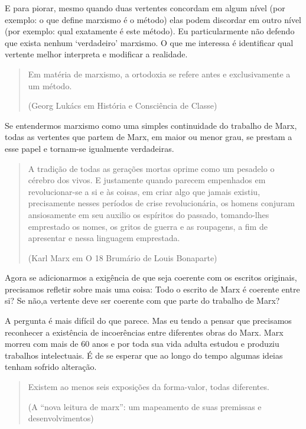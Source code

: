 E para piorar, mesmo quando duas vertentes concordam em algum nível (por exemplo: o que define marxismo é o método) elas podem discordar em outro nível (por exemplo: qual exatamente é este método). Eu particularmente não defendo que exista nenhum ‘verdadeiro’ marxismo. O que me interessa é identificar qual vertente melhor interpreta e modificar a realidade.

\begin{quote}
Em matéria de marxismo, a ortodoxia se refere antes e exclusivamente a um método.

(Georg Lukács em História e Consciência de Classe)
\end{quote}

Se entendermos marxismo como uma simples continuidade do trabalho de Marx, todas as vertentes que partem de Marx, em maior ou menor grau, se prestam a esse papel e tornam-se igualmente verdadeiras.

\begin{quote}
A tradição de todas as gerações mortas oprime como um pesadelo o cérebro dos vivos. E justamente quando parecem empenhados em revolucionar-se a si e às coisas, em criar algo que jamais existiu, precisamente nesses períodos de crise revolucionária, os homens conjuram ansiosamente em seu auxilio os espíritos do passado, tomando-lhes emprestado os nomes, os gritos de guerra e as roupagens, a fim de apresentar e nessa linguagem emprestada.

(Karl Marx em O 18 Brumário de Louis Bonaparte)
\end{quote}

Agora se adicionarmos a exigência de que seja coerente com os escritos originais, precisamos refletir sobre mais uma coisa: Todo o escrito de Marx é coerente entre si? Se não,a vertente deve ser coerente com que parte do trabalho de Marx?

A pergunta é mais difícil do que parece. Mas eu tendo a pensar que precisamos reconhecer a existência de incoerências entre diferentes obras do Marx. Marx morreu com mais de 60 anos e por toda sua vida adulta estudou e produziu trabalhos intelectuais. É de se esperar que ao longo do tempo algumas ideias tenham sofrido alteração.

\begin{quote}
Existem ao menos seis exposições da forma-valor, todas diferentes.

(A “nova leitura de marx”: um mapeamento de suas premissas e desenvolvimentos)
\end{quote}

